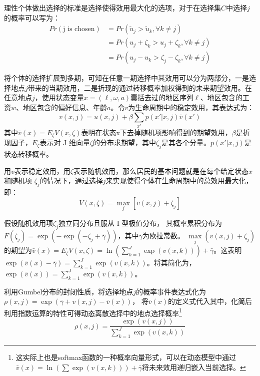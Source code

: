 \documentclass[a4paper,12pt]{article}
\begin{document}
理性个体做出选择的标准是选择使得效用最大化的选项，对于在选择集$C$中选择$j$的概率可以写为：
\begin{equation}
\begin{split}
  Pr(\text{j is chosen})&=Pr(\tilde u_j > \tilde u_k, \forall k \neq j)
  \\&=Pr(u_j+\zeta_k>u_j+\zeta_k, \forall k \neq j)
  \\&=Pr(u_j-u_k>\zeta_j-\zeta_k, \forall k \neq j)
\end{split}
\end{equation}












将个体的选择扩展到多期，可知在任意一期选择中其效用可以分为两部分，一是选择地点$j$带来的当期效用，二是折现的通过转移概率加权得到的未来期望效用。在任意地点$j$，使用状态变量$x=(\ell,\omega,a)$囊括去过的地区序列$\ell$、地区包含的工资$w$、地区包含的偏好信息、年龄$a$。令$v$为生命周期中的稳定效用，其表达式为：
\begin{equation}
  v(x, j) = u(x, j) + \beta \sum_{x'} p(x' | x, j) \bar{v}(x')
\end{equation}
其中$\bar{v}(x) = E_{\zeta} V(x, \zeta)$表明在状态x下去掉随机项影响得到的期望效用，$\beta$是折现因子，$E_{\zeta}$表示对 J 维向量$\zeta$的分布求期望，其中$\zeta_{j}$是其各个分量。$p(x'|x,j)$是状态转移概率。

用$v$表示稳定效用，用$\zeta$表示随机效用，那么居民的基本问题就是在每个给定状态$x$和随机项 $\zeta_j$的情况下，通过选择$j$来实现使得个体在生命周期中的总效用最大化，即：
\begin{equation}
V(x,\zeta)=\max\limits_{j}[v(x,j)+\zeta_{j}]
\end{equation}

假设随机效用项$\zeta_j$独立同分布且服从 I 型极值分布，
其概率累积分布为
$F(\zeta_j)=\exp(-\exp(-\zeta_j+\bar \gamma))$，其中$\bar \gamma$为欧拉常数。
$\max\limits_j (v(x,j)+\zeta_j)$的期望为$\bar v(x) = E_\zeta V(x,\zeta)= \ln(\sum\limits_{k=1}^J \exp(v(x,k)))+\bar \gamma$。这表明$\exp(\bar v(x)-\bar \gamma)=\sum\limits_{k=1}^J \exp(v(x,k))$。将其简化为，$\exp(\bar v(x))=\sum\limits_{k=1}^J \exp(v(x,k))$。

利用Gumbel分布的封闭性质，将选择地点$j$的概率事件表达式化为$\rho(x,j)=\exp(\bar \gamma + v(x,j) - \bar v(x))$，
将$\bar v(x)$的定义式代入其中，化简后利用指数运算的特性可得动态离散选择中的地点选择概率\footnote{这实际上也是softmax函数的一种概率向量形式，可以在动态模型中通过$\bar v(x) = \ln (\sum \exp(v(x,k)))+\bar \gamma $将未来效用递归嵌入当前选择。}
\begin{equation}
  \rho(x,j)=\frac{\exp(v(x,j))}{\sum\limits_{k=1}^J \exp(v(x,k))}
\end{equation}
\end{document}
